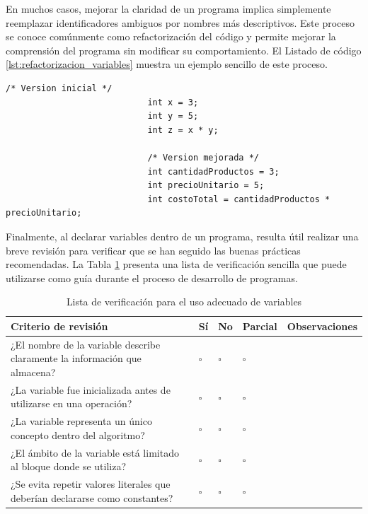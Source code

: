 \documentclass[12pt,twoside]{book}
\begin{document}
						\noindent
						En muchos casos, mejorar la claridad de un programa implica simplemente reemplazar identificadores ambiguos por nombres más descriptivos. Este proceso se conoce comúnmente como refactorización del código y permite mejorar la comprensión del programa sin modificar su comportamiento. El Listado de código \ref{lst:refactorizacion_variables} muestra un ejemplo sencillo de este proceso.
						
						\begin{lstlisting}[style=Java,caption={Refactorización de nombres de variables para mejorar la claridad del programa.},label={lst:refactorizacion_variables}]
							/* Version inicial */
							int x = 3;
							int y = 5;
							int z = x * y;
							
							/* Version mejorada */
							int cantidadProductos = 3;
							int precioUnitario = 5;
							int costoTotal = cantidadProductos * precioUnitario;
						\end{lstlisting}
						
						\noindent
						Finalmente, al declarar variables dentro de un programa, resulta útil realizar una breve revisión para verificar que se han seguido las buenas prácticas recomendadas. La Tabla \ref{tab:checklist_variables} presenta una lista de verificación sencilla que puede utilizarse como guía durante el proceso de desarrollo de programas.
						
						\begin{table}[!hbt]
							\centering
							\caption{Lista de verificación para el uso adecuado de variables}
							\label{tab:checklist_variables}
							\small
							\begin{tabularx}{\textwidth}{
									>{\raggedright\arraybackslash}X
									>{\centering\arraybackslash}p{1.2cm}
									>{\centering\arraybackslash}p{1.2cm}
									>{\centering\arraybackslash}p{1.2cm}
									>{\centering\arraybackslash}p{3cm}}
								\toprule
								\textbf{Criterio de revisión} & \textbf{Sí} & \textbf{No} & \textbf{Parcial} & \textbf{Observaciones} \\
								\midrule
								¿El nombre de la variable describe claramente la información que almacena? & $\square$ & $\square$ & $\square$ & \\
								
								¿La variable fue inicializada antes de utilizarse en una operación? & $\square$ & $\square$ & $\square$ & \\
								
								¿La variable representa un único concepto dentro del algoritmo? & $\square$ & $\square$ & $\square$ & \\
								
								¿El ámbito de la variable está limitado al bloque donde se utiliza? & $\square$ & $\square$ & $\square$ & \\
								
								¿Se evita repetir valores literales que deberían declararse como constantes? & $\square$ & $\square$ & $\square$ & \\
								
								\bottomrule
							\end{tabularx}
						\end{table}
\end{document}
